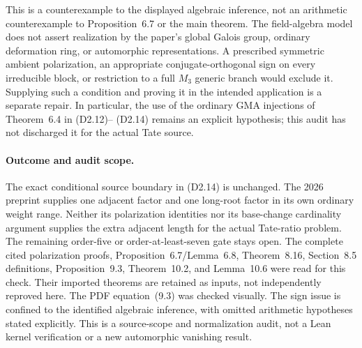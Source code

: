 This is a counterexample to the displayed algebraic inference,
not an arithmetic counterexample to Proposition~6.7 or the main
theorem.  The field-algebra model does not assert realization by
the paper's global Galois group, ordinary deformation ring, or
automorphic representations.  A prescribed symmetric ambient
polarization, an appropriate conjugate-orthogonal sign on every
irreducible block, or restriction to a full $M_3$ generic branch
would exclude it.  Supplying such a condition and proving it in
the intended application is a separate repair.  In particular,
the use of the ordinary GMA injections of Theorem~6.4 in (D2.12)--
(D2.14) remains an explicit hypothesis; this audit has not
discharged it for the actual Tate source.

\paragraph{Outcome and audit scope.}
The exact conditional source boundary in (D2.14) is unchanged.
The 2026 preprint supplies one adjacent factor and one long-root
factor in its own ordinary weight range.  Neither its polarization
identities nor its base-change cardinality argument supplies the
extra adjacent length for the actual Tate-ratio problem.  The
remaining order-five or order-at-least-seven gate stays open.
The complete cited polarization proofs, Proposition~6.7/Lemma~6.8,
Theorem~8.16, Section~8.5 definitions, Proposition~9.3,
Theorem~10.2, and Lemma~10.6 were read for this check.  Their imported
theorems are retained as inputs, not independently reproved here.
The PDF equation~(9.3) was checked visually.  The sign issue is
confined to the identified algebraic inference, with omitted
arithmetic hypotheses stated explicitly.  This is a source-scope
and normalization audit, not a Lean kernel verification or a new
automorphic vanishing result.
